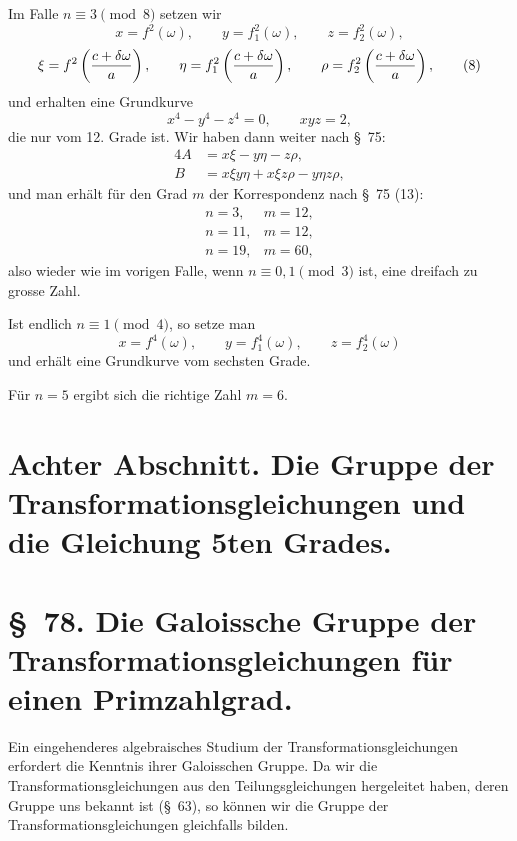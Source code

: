 \documentclass[11pt]{article}
\begin{document}
Im Falle $n\equiv3\pmod 8$ setzen wir
\begin{equation}
 x=f^2(\omega),\qquad y=f_1^2(\omega),\qquad z=f_2^2(\omega),
\end{equation}
\begin{equation}
 \xi=f^2\left({c+\delta\omega\over a}\right),\qquad
 \eta=f_1^2\left({c+\delta\omega\over a}\right),\qquad
 \rho=f_2^2\left({c+\delta\omega\over a}\right),
\tag{8}
\end{equation}
und erhalten eine Grundkurve
\begin{equation}
 x^4-y^4-z^4=0,
 \qquad
 xyz=2,
\tag{9}
\end{equation}
die nur vom 12. Grade ist. Wir haben dann weiter nach \S~75:
\begin{equation}
\begin{aligned}
4A&=x\xi-y\eta-z\rho,\\
B&=x\xi y\eta+x\xi z\rho-y\eta z\rho,
\end{aligned}
\tag{10}
\end{equation}
und man erhält für den Grad $m$ der Korrespondenz nach \S~75 (13):
\[
\begin{array}{c|c}
 n=3,&m=12,\\
 n=11,&m=12,\\
 n=19,&m=60,
\end{array}
\]
also wieder wie im vorigen Falle, wenn $n\equiv0,1\pmod 3$ ist, eine dreifach zu grosse Zahl.

Ist endlich $n\equiv1\pmod4$, so setze man
\[
 x=f^4(\omega),\qquad y=f_1^4(\omega),\qquad z=f_2^4(\omega)
\]
und erhält eine Grundkurve vom sechsten Grade.

Für $n=5$ ergibt sich die richtige Zahl $m=6$.

\section*{Achter Abschnitt. Die Gruppe der Transformationsgleichungen und die Gleichung 5ten Grades.}

\section*{\S~78. Die Galoissche Gruppe der Transformationsgleichungen für einen Primzahlgrad.}

Ein eingehenderes algebraisches Studium der Transformationsgleichungen erfordert die Kenntnis ihrer Galoisschen Gruppe. Da wir die Transformationsgleichungen aus den Teilungsgleichungen hergeleitet haben, deren Gruppe uns bekannt ist (\S~63), so können wir die Gruppe der Transformationsgleichungen gleichfalls bilden.
\end{document}
